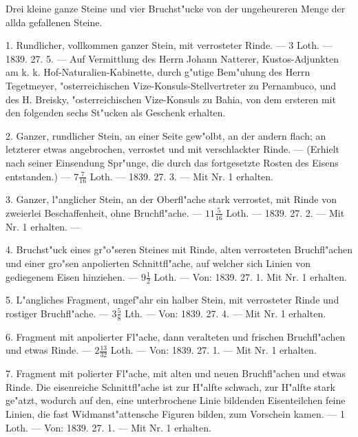 \documentclass[a4paper, 11pt, oneside, polutonikogreek, german]{article}
\begin{document}
Drei kleine ganze Steine und vier Bruchst"ucke von der ungeheureren Menge der allda gefallenen Steine.

1. Rundlicher, vollkommen ganzer Stein, mit verrosteter Rinde. --- 3 Loth. --- 1839. 27. 5. --- Auf Vermittlung des Herrn Johann Natterer, Kustos-Adjunkten am k. k. Hof-Naturalien-Kabinette, durch g"utige Bem"uhung des Herrn Tegetmeyer, "osterreichischen Vize-Konsuls-Stellvertreter zu Pernambuco, und des H. Breisky, "osterreichischen Vize-Konsuls zu Bahia, von dem ersteren mit den folgenden sechs St"ucken als Geschenk erhalten.

2. Ganzer, rundlicher Stein, an einer Seite gew"olbt, an der andern flach; an letzterer etwas angebrochen, verrostet und mit verschlackter Rinde. --- (Erhielt nach seiner Einsendung Spr"unge, die durch das fortgesetzte Rosten des Eisens entstanden.) --- $7\frac{7}{16}$ Loth. --- 1839. 27. 3. --- Mit Nr. 1 erhalten.

3. Ganzer, l"anglicher Stein, an der Oberfl"ache stark verrostet, mit Rinde von zweierlei Beschaffenheit, ohne Bruchfl"ache. --- $11\frac{5}{16}$ Loth. --- 1839. 27. 2. --- Mit Nr. 1 erhalten. ---

4. Bruchst"uck eines gr"o"seren Steines mit Rinde, alten verrosteten Bruchfl"achen und einer gro"sen anpolierten Schnittfl"ache, auf welcher sich Linien von gediegenem Eisen hinziehen. --- $9\frac{1}{2}$ Loth. --- Von: 1839. 27. 1. Mit Nr. 1 erhalten.

5. L"angliches Fragment, ungef"ahr ein halber Stein, mit verrosteter Rinde und rostiger Bruchfl"ache. --- $3\frac{5}{8}$ Lth. --- Von: 1839. 27. 4. --- Mit Nr. 1 erhalten.

6. Fragment mit anpolierter Fl"ache, dann veralteten und frischen Bruchfl"achen und etwas Rinde. --- $2\frac{13}{32}$ Loth. --- Von: 1839. 27. 1. --- Mit Nr. 1 erhalten.

7. Fragment mit polierter Fl"ache, mit alten und neuen Bruchfl"achen und etwas Rinde. Die eisenreiche Schnittfl"ache ist zur H"alfte schwach, zur H"alfte stark ge"atzt, wodurch auf den, eine unterbrochene Linie bildenden Eisenteilchen feine Linien, die fast Widmanst"attensche Figuren bilden, zum Vorschein kamen. --- 1 Loth. --- Von: 1839. 27. 1. --- Mit Nr. 1 erhalten.

\setlength{\leftskip}{10mm}
\setlength{\parindent}{0pt}
\end{document}
